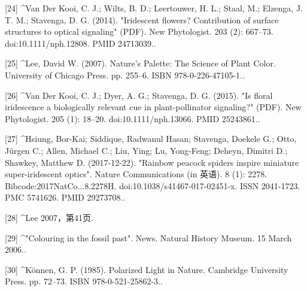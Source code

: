 [24]
^Van Der Kooi, C. J.; Wilts, B. D.; Leertouwer, H. L.; Staal, M.; Elzenga, J. T. M.; Stavenga, D. G. (2014). "Iridescent flowers? Contribution of surface structures to optical signaling" (PDF). New Phytologist. 203 (2): 667–73. doi:10.1111/nph.12808. PMID 24713039..

[25]
^Lee, David W. (2007). Nature's Palette: The Science of Plant Color. University of Chicago Press. pp. 255–6. ISBN 978-0-226-47105-1..

[26]
^Van Der Kooi, C. J.; Dyer, A. G.; Stavenga, D. G. (2015). "Is floral iridescence a biologically relevant cue in plant-pollinator signaling?" (PDF). New Phytologist. 205 (1): 18–20. doi:10.1111/nph.13066. PMID 25243861..

[27]
^Hsiung, Bor-Kai; Siddique, Radwanul Hasan; Stavenga, Doekele G.; Otto, Jürgen C.; Allen, Michael C.; Liu, Ying; Lu, Yong-Feng; Deheyn, Dimitri D.; Shawkey, Matthew D. (2017-12-22). "Rainbow peacock spiders inspire miniature super-iridescent optics". Nature Communications (in 英语). 8 (1): 2278. Bibcode:2017NatCo...8.2278H. doi:10.1038/s41467-017-02451-x. ISSN 2041-1723. PMC 5741626. PMID 29273708..

[28]
^Lee 2007，第41页.

[29]
^"Colouring in the fossil past". News. Natural History Museum. 15 March 2006..

[30]
^Können, G. P. (1985). Polarized Light in Nature. Cambridge University Press. pp. 72–73. ISBN 978-0-521-25862-3..
